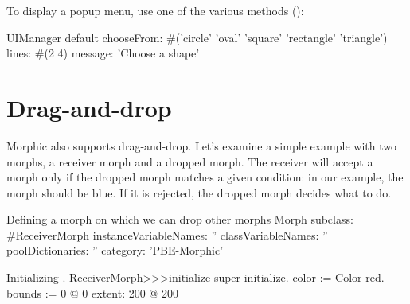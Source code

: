\documentclass[a4paper,10pt,twoside]{book}
\begin{document}
To display a popup menu, use one of the various  methods ():
\begin{code}{}
UIManager default
	chooseFrom: #('circle' 'oval' 'square' 'rectangle' 'triangle')
	lines: #(2 4) message: 'Choose a shape'
\end{code}





\section{Drag-and-drop}

Morphic also supports drag-and-drop. Let's examine a simple example with two morphs, a receiver morph and a dropped morph. 
The receiver will accept a morph only if the dropped morph matches a given condition: in our example,  the morph should be blue. If it is rejected, the dropped morph decides what to do.

\begin{classdef}{Defining a morph on which we can drop other morphs}
Morph subclass: #ReceiverMorph
	instanceVariableNames: ''
	classVariableNames: ''
	poolDictionaries: ''
	category: 'PBE-Morphic'
\end{classdef}

\begin{method}{Initializing .}
ReceiverMorph>>>initialize
	super initialize.
	color := Color red.
	bounds := 0 @ 0 extent: 200 @ 200
\end{method}
\end{document}
